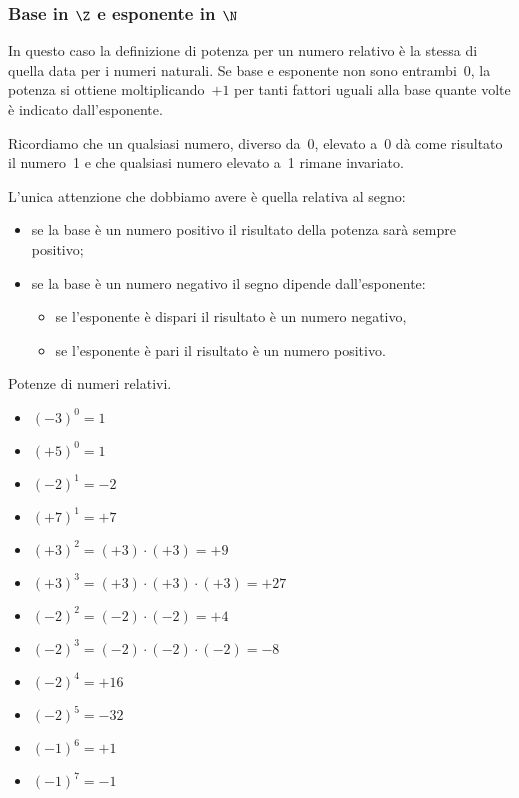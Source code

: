 \subsubsection{Base in $\Z$ e esponente in $\N$}

In questo caso la definizione di potenza per un numero relativo è la stessa 
di quella data per i numeri naturali.
Se base e esponente non sono entrambi~0, la potenza si ottiene 
moltiplicando~\(+1\) per tanti fattori uguali alla base quante volte è 
indicato dall'esponente.

Ricordiamo che un qualsiasi numero, diverso da~0, elevato a~0 dà come 
risultato il numero~1 e che qualsiasi numero elevato a~1 rimane invariato.

L'unica attenzione che dobbiamo avere è quella relativa al segno:
\begin{itemize} [nosep]
\item se la base è un numero positivo il risultato della potenza sarà 
sempre positivo;
\item se la base è un numero negativo il segno dipende dall'esponente: 
\begin{itemize} [nosep]
\item se l'esponente è dispari il risultato è un numero negativo,
\item se l'esponente è pari il risultato è un numero positivo.
\end{itemize}
\end{itemize}

\begin{esempio}{}{}
Potenze di numeri relativi.
\begin{multicols}{2}
\begin{itemize} [noitemsep]
\item \((-3)^0=1\)
\item \((+5)^0=1\) 
\item \((-2)^1=-2\) 
\item \((+7)^1=+7\) 
\item \((+3)^2=(+3)\cdot(+3)=+9\)
\item \((+3)^3=(+3)\cdot(+3)\cdot(+3)=+27\)
\item \((-2)^2=(-2)\cdot(-2)=+4\)
\item \((-2)^3=(-2)\cdot(-2)\cdot(-2)=-8\)
\item \((-2)^4=+16\)
\item \((-2)^5=-32\)
\item \((-1)^6=+1\)
\item \((-1)^7=-1\)
\end{itemize}
\end{multicols}
\end{esempio}

